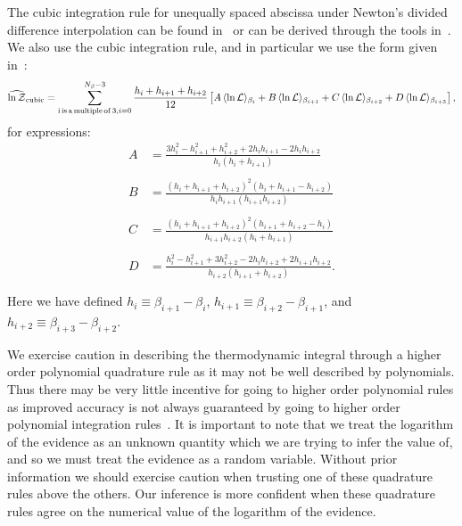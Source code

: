 The cubic integration rule for unequally spaced abscissa under Newton's divided difference interpolation can be found in~\cite{brun1953generalization,selmer1958numerical,chambers1989estimating} or can be derived through the tools in~\cite{abramowitz1965handbook}. We also use the cubic integration rule, and in particular we use the form given in~\cite{chambers1989estimating}:
\begin{equation}
    \widehat{\mathrm{ln} \, \mathcal{Z}}_{\mathrm{cubic}} = \sum_{\mathrm{i\, is\, a \, multiple \, of \, 3}, \\ i=0}^{N_\beta-3} \frac{h_i + h_{i+1} + h_{i+2}}{12} \left [A \, \langle \mathrm{ln} \, \mathcal{L} \rangle_{\beta_{i}} + B \, \langle \mathrm{ln} \, \mathcal{L} \rangle_{\beta_{i+1}} + C \, \langle \mathrm{ln} \, \mathcal{L} \rangle_{\beta_{i+2}} + D \, \langle \mathrm{ln} \, \mathcal{L} \rangle_{\beta_{i+3}}\right ],
\end{equation}
for expressions:
\begin{equation}
\begin{array}{llll}
     A &= \frac{3h_i^2 -h_{i+1}^2 +h_{i+2}^2 +2 h_i h_{i+1} - 2h_i h_{i+2}}{h_i (h_i + h_{i+1})} \\ \\
     B &= \frac{(h_i + h_{i+1} + h_{i+2})^2 (h_i + h_{i+1} - h_{i+2})}{h_{i} h_{i+1} (h_{i+1} h_{i+2})} \\ \\
     C &= \frac{(h_i + h_{i+1} + h_{i+2})^2 (h_{i+1} + h_{i+2} - h_i)}{h_{i+1} h_{i+2} (h_i + h_{i+1})} \\ \\
     D &= \frac{h_i^2 - h_{i+1}^2 +3 h_{i+2}^2 - 2h_i h_{i+2} + 2 h_{i+1} h_{i+2}}{h_{i+2}(h_{i+1} + h_{i+2})}.\\ \\
\end{array}
\end{equation}
Here we have defined $h_i \equiv \beta_{i+1} - \beta_{i}$, $h_{i+1} \equiv \beta_{i+2} - \beta_{i+1}$, and $h_{i+2} \equiv \beta_{i+3} - \beta_{i+2}$.

We exercise caution in describing the thermodynamic integral through a higher order polynomial quadrature rule as it may not be well described by polynomials. Thus there may be very little incentive for going to higher order polynomial rules as improved accuracy is not always guaranteed by going to higher order polynomial integration rules~\citep{epperson1987runge}. It is important to note that we treat the logarithm of the evidence as an unknown quantity which we are trying to infer the value of, and so we must treat the evidence as a random variable. Without prior information we should exercise caution when trusting one of these quadrature rules above the others. Our inference is more confident when these quadrature rules agree on the numerical value of the logarithm of the evidence.

